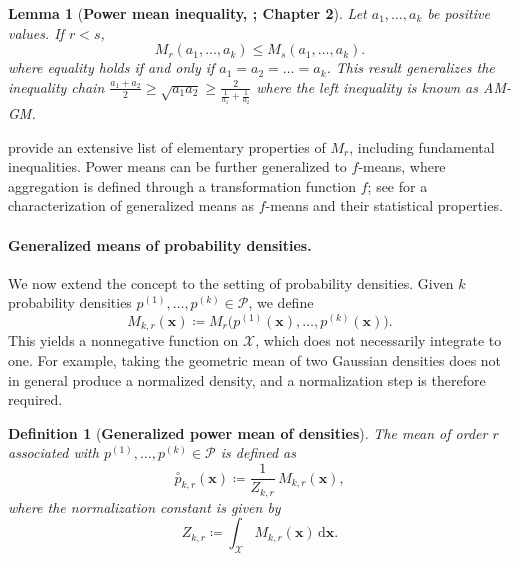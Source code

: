 \documentclass[accepted]{uai2026} %
\newtheorem{lemma}{Lemma}[section]
\newtheorem{definition}{Definition}[section]
\newcommand{\vx}{\mathbf{x}}
\newcommand{\compose}[1]{\overset{\circ}{#1}}
\begin{document}
\begin{lemma}[\textbf{Power mean inequality, \citealp{hardy1952inequalities}; Chapter 2}]\label{lemma: p-mean inequality}
Let $a_1,\dots,a_k$ be positive values. If $r<s$, 
\begin{equation}
M_r(a_1,\dots,a_k) \leq M_s(a_1,\dots,a_k).
\end{equation}
where equality holds if and only if $a_1 = a_2 = \dots = a_k$. This result generalizes the inequality chain $\frac{a_1+a_2}{2} \geq \sqrt{a_1 a_2} \geq \frac{2}{\frac{1}{a_1} + \frac{1}{a_2}}$ where the left inequality is known as AM-GM.
\end{lemma}

\citet{hardy1952inequalities} provide an extensive list of elementary properties of $M_r$, including fundamental inequalities. Power means can be further generalized to $f$-means, where aggregation is defined through a transformation function $f$; see \citet{de2016mean} for a characterization of generalized means as $f$-means and their statistical properties.

\paragraph{Generalized means of probability densities.}We now extend the concept to the setting of probability densities. 
Given $k$ probability densities $p^{(1)},\dots,p^{(k)} \in \mathcal{P}$, we define 
\begin{equation}
M_{k,r}(\vx) \coloneqq M_{r}\big(p^{(1)}(\vx),\dots,p^{(k)}(\vx)\big).
\end{equation}
This yields a nonnegative function on $\mathcal{X}$, which does not necessarily integrate to one. For example, taking the geometric mean of two Gaussian densities does not in general produce a normalized density, and a normalization step is therefore required.


\begin{definition}[\textbf{Generalized power mean of densities}]\label{definition: generalized power mean of densities}
The mean of order $r$ associated with $p^{(1)},\dots,p^{(k)} \in \mathcal{P}$ is defined as
\begin{equation}
\compose{p}_{k,r}(\vx) \coloneqq \frac{1}{Z_{k,r}}\, M_{k,r}(\vx),
\end{equation}
where the normalization constant is given by
\begin{equation}
Z_{k,r} \coloneqq \int_{\mathcal{X}} M_{k,r}(\vx)\,\mathrm{d}\vx.
\end{equation}
\end{definition}
\end{document}
